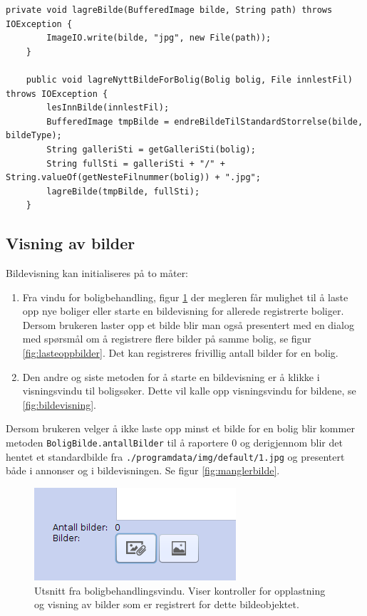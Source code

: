 \begin{lstlisting}[caption=BoligBilde.java: Lagring av et nytt eller tillegsbilde for en bolig, label=kode:bildelagring]
	private void lagreBilde(BufferedImage bilde, String path) throws IOException {
        ImageIO.write(bilde, "jpg", new File(path));
    }

	public void lagreNyttBildeForBolig(Bolig bolig, File innlestFil) throws IOException {
        lesInnBilde(innlestFil);
        BufferedImage tmpBilde = endreBildeTilStandardStorrelse(bilde, bildeType);
        String galleriSti = getGalleriSti(bolig);
        String fullSti = galleriSti + "/" + String.valueOf(getNesteFilnummer(bolig)) + ".jpg";
        lagreBilde(tmpBilde, fullSti);
    }
\end{lstlisting}

\subsection{Visning av bilder}
Bildevisning kan initialiseres på to måter: 
\begin{enumerate}
\item Fra vindu for boligbehandling, figur \ref{fig:bildebahndling} der megleren får mulighet til å laste opp nye boliger eller starte en bildevisning for allerede registrerte boliger. Dersom brukeren laster opp et bilde blir man også presentert med en dialog med spørsmål om å registrere flere bilder på samme bolig, se figur \ref{fig:lasteoppbilder}. Det kan registreres frivillig antall bilder for en bolig.
\item Den andre og siste metoden for å starte en bildevisning er å klikke i visningsvindu til boligsøker. Dette vil kalle opp visningsvindu for bildene, se \ref{fig:bildevisning}.
\end{enumerate}

Dersom brukeren velger å ikke laste opp minst et bilde for en bolig blir kommer metoden \texttt{BoligBilde.antallBilder} til å raportere 0 og derigjennom blir det hentet et standardbilde fra \texttt{./programdata/img/default/1.jpg} og presentert både i annonser og i bildevisningen. Se figur \ref{fig:manglerbilde}. 


\begin{figure}[ht!]
\center
 \includegraphics[trim=0cm 0.5cm 0cm 1.6cm,clip]{./img/produktdokumentasjon/bilder/1.png}
 \caption{Utsnitt fra boligbehandlingsvindu. Viser kontroller for opplastning og visning av bilder som er registrert for dette bildeobjektet.}
 \label{fig:bildebahndling}
\end{figure}

